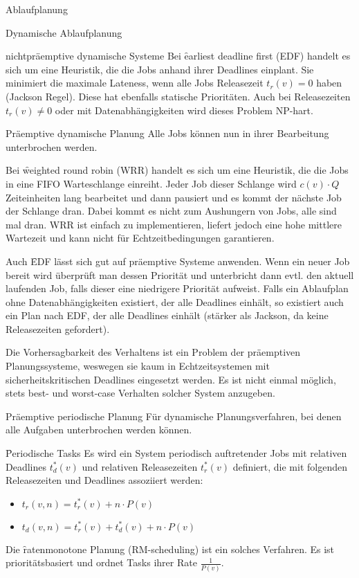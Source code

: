 \begin{chapter}{Ablaufplanung}
\begin{section}{Dynamische Ablaufplanung}
\begin{subsection}{nichtpräemptive dynamische Systeme}
   Bei \f{earliest deadline first (EDF)} handelt es sich um eine Heuristik, die die Jobs anhand ihrer Deadlines einplant. Sie minimiert die maximale Lateness, wenn alle Jobs Releasezeit $t_r(v)=0$ haben (Jackson Regel). Diese hat ebenfalls statische Prioritäten. Auch bei Releasezeiten $t_r(v) \neq 0$ oder mit Datenabhängigkeiten wird dieses Problem NP-hart.
  \end{subsection}
  
  \begin{subsection}{Präemptive dynamische Planung}
   Alle Jobs können nun in ihrer Bearbeitung unterbrochen werden. 
   
   Bei \f{weighted round robin (WRR)} handelt es sich um eine Heuristik, die die Jobs in eine FIFO Warteschlange einreiht. Jeder Job dieser Schlange wird $c(v)\cdot Q$ Zeiteinheiten lang bearbeitet und dann pausiert und es kommt der nächste Job der Schlange dran. Dabei kommt es nicht zum Aushungern von Jobs, alle sind mal dran. WRR ist einfach zu implementieren, liefert jedoch eine hohe mittlere Wartezeit und kann nicht für Echtzeitbedingungen garantieren.
   
   Auch \f{EDF} lässt sich gut auf präemptive Systeme anwenden. Wenn ein neuer Job bereit wird überprüft man dessen Priorität und unterbricht dann evtl. den aktuell laufenden Job, falls dieser eine niedrigere Priorität aufweist. Falls ein Ablaufplan ohne Datenabhängigkeiten existiert, der alle Deadlines einhält, so existiert auch ein Plan nach EDF, der alle Deadlines einhält (stärker als Jackson, da keine Releasezeiten gefordert).
   
   Die Vorhersagbarkeit des Verhaltens ist ein Problem der präemptiven Planungssysteme, weswegen sie kaum in Echtzeitsystemen mit sicherheitskritischen Deadlines eingesetzt werden. Es ist nicht einmal möglich, stets best- und worst-case Verhalten solcher System anzugeben.
  \end{subsection}
   
  \begin{subsection}{Präemptive periodische Planung}
   Für dynamische Planungsverfahren, bei denen alle Aufgaben unterbrochen werden können.
   
   \f{Periodische Tasks}
   Es wird ein System periodisch auftretender Jobs mit relativen Deadlines $t_d^*(v)$ und relativen Releasezeiten $t_r^*(v)$ definiert, die mit folgenden Releasezeiten und Deadlines assoziiert werden:
   \begin{itemize}
    \item $t_r(v,n) = t_r^*(v)+n\cdot P(v)$
    \item $t_d(v,n) = t_r^*(v)+t_d^*(v)+n\cdot P(v)$
   \end{itemize}
   
   Die \f{ratenmonotone Planung (RM-scheduling)} ist ein solches Verfahren. Es ist prioritätsbasiert und ordnet Tasks ihrer Rate $\frac{1}{P(v)}$.
   


  \end{subsection}
  \end{section}
\end{chapter}
